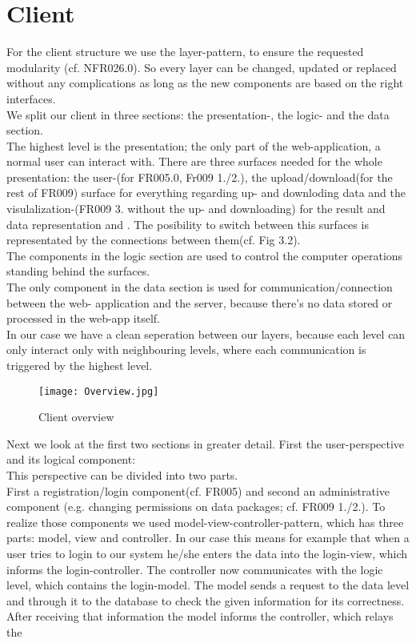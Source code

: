\documentclass{book}
\begin{document}
\section{Client} 
For the client structure we use the layer-pattern, to  ensure the requested modularity (cf. NFR026.0).
So every layer can be changed, updated or replaced without any complications as long as
 the new components are based on the right interfaces.\\
We split our client in three sections: the presentation-, the logic- and the data section.\\
The highest level is the presentation; the only part of the web-application, a normal user
can interact with. There are three surfaces needed for the whole presentation: 
the user-(for FR005.0, Fr009 1./2.), the upload/download(for the rest of FR009) surface for everything
regarding up- and downloding data and the visulalization-(FR009 3. without the up- and downloading)
for the result and data representation and . The posibility to switch between this surfaces is 
representated by the connections between them(cf. Fig 3.2).\\
The components in the logic section are used to control the computer operations standing behind the
surfaces.\\
The only component in the data section is used for communication/connection between the web- application
and the server, because there's no data stored or processed in the web-app itself.\\
In our case we have a clean seperation between our layers, because each level can only interact only
with neighbouring levels, where each communication is triggered by the highest level.
\begin{figure}
\centering
\texttt{[image: Overview.jpg]}
\caption{Client overview}
\label{Fig. 3}
\end{figure}
Next we look at the first two sections in greater detail. First the user-perspective and its logical component:\\ This perspective can be divided into two parts.\\ First a registration/login component(cf. FR005) and second an administrative component (e.g. changing permissions on data packages; cf. FR009 1./2.). To realize those components we used model-view-controller-pattern, which has three parts: model, view and controller. In our case this means for example that when a user tries to login to our system he/she enters the data into the login-view, which informs the login-controller. The controller now communicates with the logic level, which contains the login-model. The model sends a request to the data level and through it to the database to check the given information for its correctness. After receiving that information the model informs the controller, which relays the  
\end{document}
